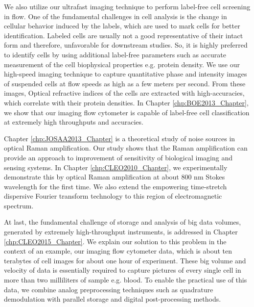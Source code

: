 We also utilize our ultrafast imaging technique to perform label-free cell screening in flow. One of the fundamental challenges in cell analysis is the change in cellular behavior induced by the labels, which are used to mark cells for better identification. Labeled cells are usually not a good representative of their intact form and therefore, unfavorable for downstream studies. So, it is highly preferred to identify cells by using additional label-free parameters such as accurate measurement of the cell biophysical properties e.g. protein density. We use our high-speed imaging technique to capture quantitative phase and intensity images of suspended cells at flow speeds as high as a few meters per second. From these images, Optical refractive indices of the cells are extracted with high-accuracies, which correlate with their protein densities. In Chapter \ref{chp:BOE2013_Chapter}, we show that our imaging flow cytometer is capable of label-free cell classification at extremely high throughputs and accuracies. 

Chapter \ref{chp:JOSAA2013_Chapter} is a theoretical study of noise sources in optical Raman amplification. Our study shows that the Raman amplification can provide an approach to improvement of sensitivity of biological imaging and sensing systems. In Chapter \ref{chp:CLEO2010_Chapter}, we experimentally demonstrate this by optical Raman amplification at about 800 nm Stokes wavelength for the first time. We also extend the empowering time-stretch dispersive Fourier transform technology to this region of electromagnetic spectrum. 

At last, the fundamental challenge of storage and analysis of big data volumes, generated by extremely high-throughput instruments, is addressed in Chapter \ref{chp:CLEO2015_Chapter}. We explain our solution to this problem in the context of an example, our imaging flow cytometer data, which is about ten terabytes of cell images for about one hour of experiment. These big volume and velocity of data is essentially required to capture pictures of every single cell in more than two milliliters of sample e.g. blood. To enable the practical use of this data, we combine analog preprocessing techniques such as quadrature demodulation with parallel storage and digital post-processing methods.
